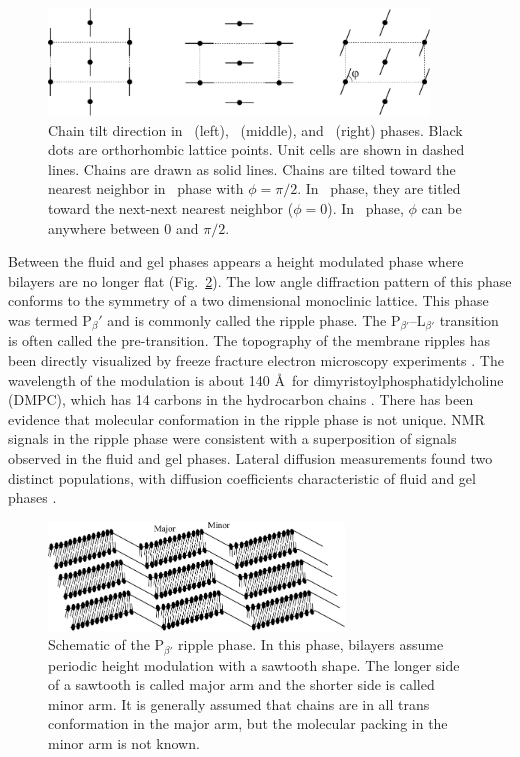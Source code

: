 \begin{figure}[htbp]
  \centering
  \includegraphics[width=0.9\textwidth]{figures/ripple/gel_phase_packing}
  \caption{Chain tilt direction in \LbetaI\ (left), \LbetaF\ (middle), and
  \LbetaL\ (right) phases. Black dots are orthorhombic lattice points.
  Unit cells are shown in dashed lines.
  Chains are drawn as solid lines. Chains are tilted toward the
  nearest neighbor in \LbetaI\ phase with $\phi=\pi/2$. 
  In \LbetaF\ phase, they are titled toward the next-next nearest neighbor
  ($\phi=0$). In \LbetaL\ phase, $\phi$ can be anywhere between 0 and $\pi/2$.}
  \label{fig:gel_phase_packing}
\end{figure}

Between the fluid and gel phases appears a height modulated phase where
bilayers are no longer flat (Fig.~\ref{fig:ripple_cartoon}). 
The low angle diffraction pattern of this phase conforms to the symmetry
of a two dimensional monoclinic lattice. This phase was termed P$_\beta'$ 
and is commonly
called the ripple phase. The P$_{\beta'}$--L$_{\beta'}$ transition is often
called the pre-transition.
The topography of the membrane ripples has been directly
visualized by freeze fracture electron microscopy experiments 
\cite{ref:Luna77,ref:Copeland80,ref:Ruppel83,ref:Zasadzinski87,ref:Zasadzinski88}.
The wavelength of the modulation is about 140 \AA\ for 
dimyristoylphosphatidylcholine (DMPC),
which has 14 carbons in the hydrocarbon chains \cite{ref:Wack89}.
There has been evidence that molecular conformation in the ripple phase is not 
unique. NMR signals in the ripple phase \cite{ref:Wittebort81} were consistent
with a superposition of signals observed in the fluid and gel phases.
Lateral diffusion measurements found two distinct populations,
with diffusion coefficients characteristic of fluid and gel phases
\cite{ref:Schneider83}. 

\begin{figure}[htbp]
  \centering
  \includegraphics[width=0.7\textwidth]{figures/ripple/ripple_cartoon}
  \caption{Schematic of the P$_{\beta'}$ ripple phase. In this phase, 
  bilayers assume periodic height modulation with a sawtooth shape.
  The longer side of a sawtooth is called major arm and the shorter
  side is called minor arm. It is generally assumed that chains are
  in all trans conformation in the major arm, but the molecular packing
  in the minor arm is not known.}
  \label{fig:ripple_cartoon}
\end{figure}

